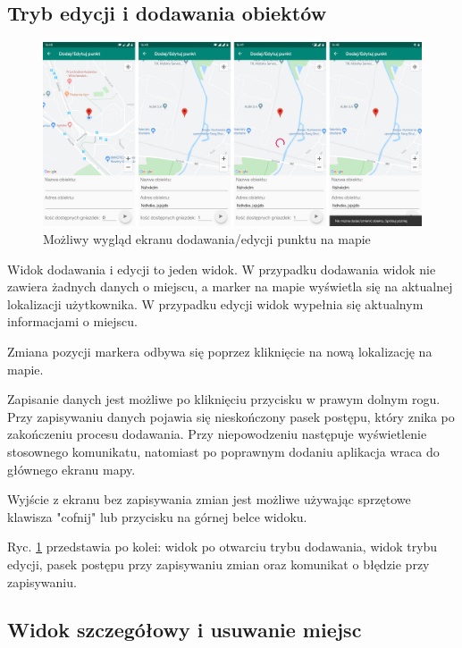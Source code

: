 \documentclass[polish,polish,a4paper,12pt]{article}
\begin{document}
	\subsection{Tryb edycji i dodawania obiektów}

	\begin{figure}[H]
		\centering
		\includegraphics[width = \textwidth]{screenshot-addedit}
		\caption{Możliwy wygląd ekranu dodawania/edycji punktu na mapie}
		\label{fig:screenshot-addedit}
	\end{figure}

	Widok dodawania i edycji to jeden widok. W przypadku dodawania widok nie zawiera żadnych danych o miejscu, a marker na mapie wyświetla się na aktualnej lokalizacji użytkownika. W przypadku edycji widok wypełnia się aktualnym informacjami o miejscu.

	Zmiana pozycji markera odbywa się poprzez kliknięcie na nową lokalizację na mapie.

	Zapisanie danych jest możliwe po kliknięciu przycisku w prawym dolnym rogu. Przy zapisywaniu danych pojawia się nieskończony pasek postępu, który znika po zakończeniu procesu dodawania. Przy niepowodzeniu następuje wyświetlenie stosownego komunikatu, natomiast po poprawnym dodaniu aplikacja wraca do głównego ekranu mapy.

	Wyjście z ekranu bez zapisywania zmian jest możliwe używając sprzętowe klawisza "cofnij" lub przycisku na górnej belce widoku.

	Ryc. \ref{fig:screenshot-addedit} przedstawia po kolei: widok po otwarciu trybu dodawania, widok trybu edycji, pasek postępu przy zapisywaniu zmian oraz komunikat o błędzie przy zapisywaniu.

	\subsection{Widok szczegółowy i usuwanie miejsc}
\end{document}
